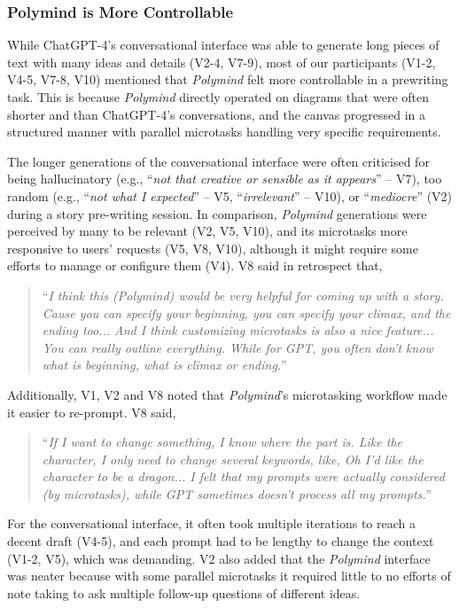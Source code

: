 \subsubsection{Polymind is More Controllable}
While ChatGPT-4's conversational interface was able to generate long pieces of text with many ideas and details (V2-4, V7-9), most of our participants (V1-2, V4-5, V7-8, V10) mentioned that \textit{Polymind} felt more controllable in a prewriting task. This is because \textit{Polymind} directly operated on diagrams that were often shorter and  than ChatGPT-4's conversations, and the canvas progressed in a structured manner with parallel microtasks handling very specific requirements.

The longer generations of the conversational interface were often criticised for being hallucinatory (e.g., ``\textit{not that creative or sensible as it appears}'' -- V7), too random (e.g., ``\textit{not what I expected}'' -- V5, ``\textit{irrelevant}'' -- V10), or ``\textit{mediocre}'' (V2) during a story pre-writing session. In comparison, \textit{Polymind} generations were perceived by many to be relevant (V2, V5, V10), and its microtasks more responsive to users' requests (V5, V8, V10), although it might require some efforts to manage or configure them (V4). 
V8 said in retrospect that,
\begin{quote}
    ``\textit{I think this (Polymind) would be very helpful for coming up with a story. Cause you can specify your beginning, you can specify your climax, and the ending too... And I think customizing microtasks is also a nice feature... You can really outline everything. While for GPT, you often don't know what is beginning, what is climax or ending.}''
\end{quote}

Additionally, V1, V2 and V8 noted that \textit{Polymind}'s microtasking workflow made it easier to re-prompt. V8 said,
\begin{quote}
    ``\textit{If I want to change something, I know where the part is. Like the character, I only need to change several keywords, like, Oh I'd like the character to be a dragon... I felt that my prompts were actually considered (by microtasks), while GPT sometimes doesn't process all my prompts.}''
\end{quote}
For the conversational interface, it often took multiple iterations to reach a decent draft (V4-5), and each prompt had to be lengthy to change the context (V1-2, V5), which was demanding. V2 also added that the \textit{Polymind} interface was neater because with some parallel microtasks it required little to no efforts of note taking to ask multiple follow-up questions of different ideas.

